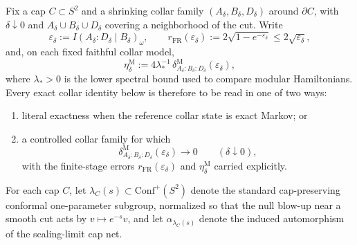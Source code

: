 \documentclass[11pt]{article}
\newcommand{\Conf}{\mathrm{Conf}}
\begin{document}
Fix a cap \(C\subset S^2\) and a shrinking collar family \((A_\delta,B_\delta,D_\delta)\) around \(\partial C\), with \(\delta\downarrow 0\) and \(A_\delta\cup B_\delta\cup D_\delta\) covering a neighborhood of the cut. Write
\[
\varepsilon_\delta:=I(A_\delta:D_\delta\mid B_\delta)_\omega,
\qquad
r_{\mathrm{FR}}(\varepsilon_\delta):=
2\sqrt{1-e^{-\varepsilon_\delta}}
\le 2\sqrt{\varepsilon_\delta},
\]
and, on each fixed faithful collar model,
\[
\eta_\delta^{\mathrm M}
:=
4\lambda_\ast^{-1}\,
\delta^{\mathrm M}_{A_\delta:B_\delta:D_\delta}(\varepsilon_\delta),
\]
where \(\lambda_\ast>0\) is the lower spectral bound used to compare modular Hamiltonians. Every exact collar identity below is therefore to be read in one of two ways:
\begin{enumerate}[leftmargin=2em]
\item literal exactness when the reference collar state is exact Markov; or
\item a controlled collar family for which
\[
\delta^{\mathrm M}_{A_\delta:B_\delta:D_\delta}(\varepsilon_\delta)\to 0
\qquad(\delta\downarrow 0),
\]
with the finite-stage errors \(r_{\mathrm{FR}}(\varepsilon_\delta)\) and \(\eta_\delta^{\mathrm M}\) carried explicitly.
\end{enumerate}

For each cap \(C\), let \(\lambda_C(s)\subset \Conf^+(S^2)\) denote the standard cap-preserving conformal one-parameter subgroup, normalized so that the null blow-up near a smooth cut acts by \(v\mapsto e^{-s}v\), and let \(\alpha_{\lambda_C(s)}\) denote the induced automorphism of the scaling-limit cap net.
\end{document}
